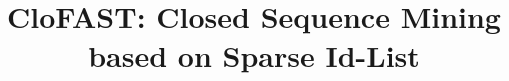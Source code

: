\documentclass{sig-alternate}
\begin{document}
%

\title{CloFAST: Closed Sequence Mining based on Sparse Id-List}
%
%
%
%
%
\end{document}
